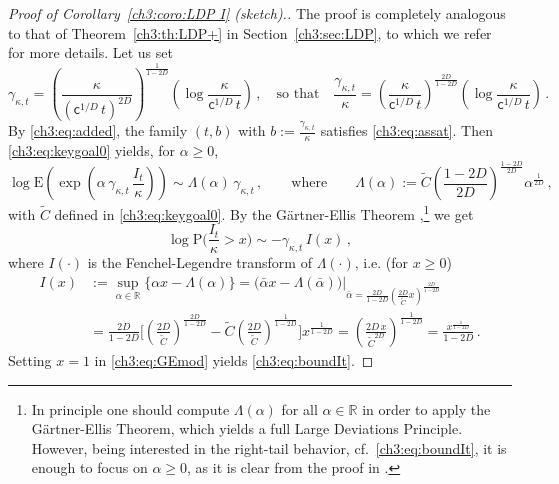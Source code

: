 \documentclass[a4paper,reqno,11pt]{amsart}
\numberwithin{equation}{section}
\renewcommand{\tilde}{\widetilde}          %
\newcommand{\R}{\mathbb{R}}
\newcommand{\PEfont}{\mathrm}
\renewcommand{\P}{\ensuremath{\PEfont P}}
\newcommand{\E}{\ensuremath{\PEfont E}}
\newcommand\sfc{\mathsf{c}}
\begin{document}
\begin{proof}[Proof of Corollary~\ref{ch3:coro:LDP I} (sketch).]
The proof is completely analogous to that of Theorem~\ref{ch3:th:LDP+} in Section~\ref{ch3:sec:LDP}, 
to which we refer for more details. Let us set
\begin{equation*} %
 \gamma_{\kappa,t}= \left(\frac{\kappa}{(\sfc^{1/D}  \,t)^{2D}}\right)^{\frac{1}{1-2D}}
 \left(\log \frac{\kappa }{\sfc^{1/D} \,t}\right)  \,, \quad \text{so that} \quad
 \frac{\gamma_{\kappa,t}}{\kappa} = 
 \left(\frac{\kappa}{\sfc^{1/D} \,t}\right)^{\frac{2D}{1-2D}}
 \left(\log \frac{\kappa }{\sfc^{1/D} \,t}\right)\,.
\end{equation*}
By \eqref{ch3:eq:added}, the family
$(t,b)$ with $b := \frac{\gamma_{\kappa,t}}{\kappa}$
satisfies \eqref{ch3:eq:assat}. Then \eqref{ch3:eq:keygoal0} yields, for $\alpha \ge 0$,
\[
 \log \E \left( \exp\left(\alpha \, \gamma_{\kappa, t} \, \frac{I_t}{\kappa}
\right) \right) \sim \Lambda(\alpha) \, \gamma_{\kappa, t} \,,
\qquad \text{where} \qquad
 \Lambda(\alpha) := \tilde C \left(\frac{1-2D}{2D}\right)^{\frac{1-2D}{2D}}\alpha ^{\frac{1}{2D}}\,,
\]
with $\tilde C$ defined in \eqref{ch3:eq:keygoal0}. 
By the G\"artner-Ellis Theorem \cite[Theorem 2.3.6]{cf:DZ},\footnote{In principle one
should compute $\Lambda(\alpha)$ for all $\alpha\in\R$ in order to apply the
G\"artner-Ellis Theorem, which yields a full Large Deviations Principle. However,
being interested in the right-tail behavior, cf.\ \eqref{ch3:eq:boundIt}, it is enough
to focus on $\alpha \ge 0$, as it is clear from the proof in \cite[Theorem 2.3.6]{cf:DZ}.}
we get
\begin{equation} \label{ch3:eq:GEmod}
	\log \P\bigg( \frac{I_t}{\kappa} > x \bigg) \sim -\gamma_{\kappa,t} \, I(x) \,,
\end{equation}
where $I(\cdot)$ is the Fenchel-Legendre transform of $\Lambda(\cdot)$, i.e. (for $x \ge 0$)
\[
\begin{split}
 I(x) & := \sup_{\alpha \in \R} \big\{ \alpha x - \Lambda(\alpha) \big\} 
 = \big( \bar\alpha x - \Lambda(\bar\alpha) \big) \Big|_{\bar \alpha = 
 \frac{2D}{1-2D} \left(\frac{2D}{\tilde C} x \right)^{\frac{2D}{1-2D}}} \\
 & = \frac{2D}{1-2D} \Bigg[ \left(\frac{2D}{\tilde C} \right)^{\frac{2D}{1-2D}}
 - \tilde C \left(\frac{2D}{\tilde C} \right)^{\frac{1}{1-2D}} \Bigg]
 x^{\frac{1}{1-2D}} 
= \left(\frac{2D \, x}{\tilde C^{2D}}\right)^{\frac{1}{1-2D}}
 = \frac{ x^{\frac{1}{1-2D}} }{1-2D} \,.
\end{split}
\]
Setting $x = 1$ in \eqref{ch3:eq:GEmod} yields \eqref{ch3:eq:boundIt}.
\end{proof}
 
\end{document}
